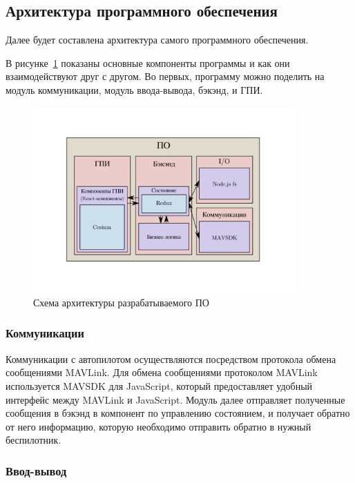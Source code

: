 \documentclass[specification,annotation]{itmo-student-thesis}
\begin{document}
\subsection{Архитектура программного обеспечения}\label{sec:archsys}

Далее будет составлена архитектура самого программного обеспечения.

В рисунке~\ref{pic:diag-arch-prog} показаны основные компоненты программы и как
они взаимодействуют друг с другом. Во первых, программу можно поделить на модуль
коммуникации, модуль ввода-вывода, бэкэнд, и ГПИ.

\begin{figure}[!h]
  \caption{Схема архитектуры разрабатываемого ПО}\label{pic:diag-arch-prog}
  \centering
  \includegraphics[width=0.9\textwidth]{diag-arch-prog}
\end{figure}

\subsubsection{Коммуникации}\label{subsubsec:comms}

Коммуникации с автопилотом осуществляются посредством протокола
обмена сообщениями MAVLink. Для обмена сообщениями протоколом MAVLink
используется MAVSDK для JavaScript, который предоставляет удобный интерфейс
между MAVLink и JavaScript. Модуль далее отправляет полученные сообщения в
бэкэнд в компонент по управлению состоянием, и получает обратно от него
информацию, которую необходимо отправить обратно в нужный беспилотник.

\subsubsection{Ввод-вывод}\label{subsubsec:io}
\end{document}
